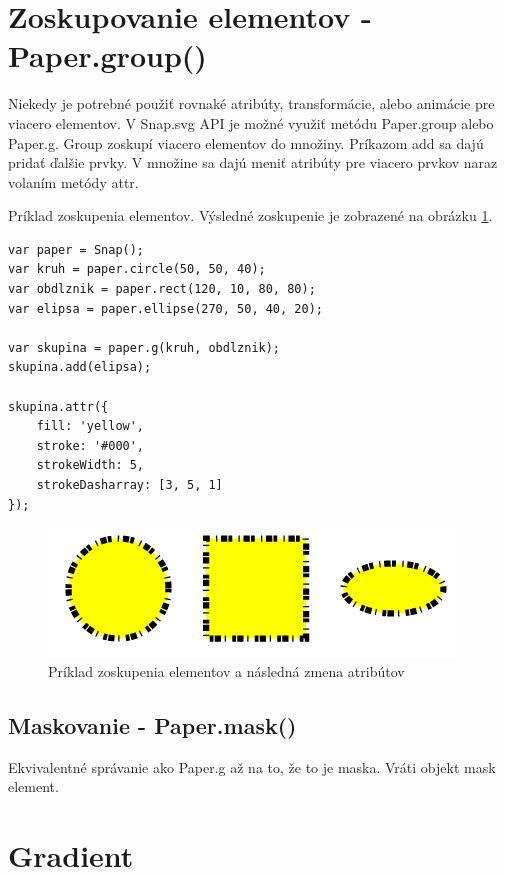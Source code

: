 \section{Zoskupovanie elementov - Paper.group()}

Niekedy je potrebné použiť rovnaké atribúty, transformácie, alebo animácie pre viacero elementov. V Snap.svg API je možné využiť metódu Paper.group alebo Paper.g. Group zoskupí viacero elementov do množiny. Príkazom add sa dajú pridať ďalšie prvky. V množine sa dajú meniť atribúty pre viacero prvkov naraz volaním metódy attr. 

Príklad zoskupenia elementov. Výsledné zoskupenie je zobrazené na obrázku \ref{fig:grupovanieElementov}. 

\begin{lstlisting}
var paper = Snap();
var kruh = paper.circle(50, 50, 40);
var obdlznik = paper.rect(120, 10, 80, 80);
var elipsa = paper.ellipse(270, 50, 40, 20);

var skupina = paper.g(kruh, obdlznik);
skupina.add(elipsa);

skupina.attr({
	fill: 'yellow',
	stroke: '#000',
	strokeWidth: 5, 
	strokeDasharray: [3, 5, 1]
});
\end{lstlisting}

\begin{figure}[H]
\centering
\includegraphics[width=0.7\linewidth]{obrazky/grupovanieElementov}
\caption{Príklad zoskupenia elementov a následná zmena atribútov}
\label{fig:grupovanieElementov}
\end{figure}

\subsection{Maskovanie - Paper.mask()}
Ekvivalentné správanie ako Paper.g až na to, že to je maska.  Vráti objekt mask element.  


\section{Gradient} 

